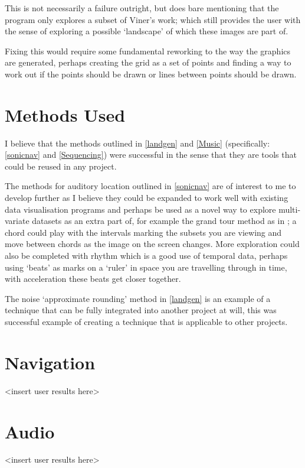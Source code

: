 This is not necessarily a failure outright, but does bare mentioning that the
program only explores a subset of Viner's work; which still provides the user
with the sense of exploring a possible `landscape' of which these images are
part of.

Fixing this would require some fundamental reworking to the way the graphics are
generated, perhaps creating the grid as a set of points and finding a way to
work out if the points should be drawn or lines between points should be drawn.

\section{Methods Used}
I believe that the methods outlined in \autoref{landgen} and
\autoref{Music} (specifically: \autoref{sonicnav} and
\autoref{Sequencing}) were successful in the sense that they are tools that
could be reused in any project.

The methods for auditory location outlined in \autoref{sonicnav} are of interest
to me to develop further as I believe they could be expanded to work well with
existing data visualisation programs and perhaps be used as a novel way to
explore multi-variate datasets as an extra part of, for example the grand tour
method as in \citep{asimov1985grand}; a chord could play with the intervals
marking the subsets you are viewing and move between chords as the image on the
screen changes. More exploration could also be completed with rhythm which is a
good use of temporal data, perhaps using `beats' as marks on a `ruler' in space
you are travelling through in time, with acceleration these beats get closer
together.

The noise `approximate rounding' method in \autoref{landgen} is an example of a
technique that can be fully integrated into another project at will, this was
successful example of creating a technique that is applicable to other projects.

\section{Navigation}
<insert user results here>

\section{Audio}
<insert user results here>

